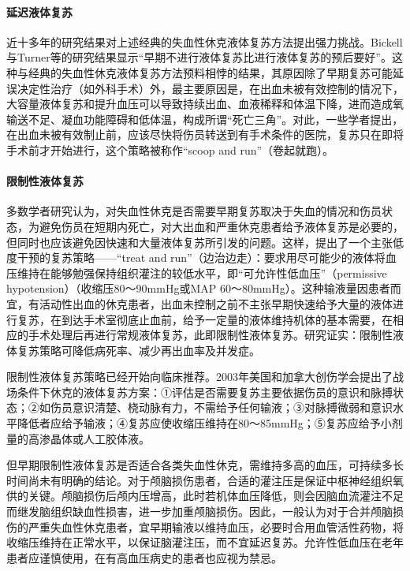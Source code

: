 \paragraph{延迟液体复苏}

近十多年的研究结果对上述经典的失血性休克液体复苏方法提出强力挑战。Bickell与Turner等的研究结果显示“早期不进行液体复苏比进行液体复苏的预后要好”。这种与经典的失血性休克液体复苏方法预料相悖的结果，其原因除了早期复苏可能延误决定性治疗（如外科手术）外，最主要原因是，在出血未被有效控制的情况下，大容量液体复苏和提升血压可以导致持续出血、血液稀释和体温下降，进而造成氧输送不足、凝血功能障碍和低体温，构成所谓“死亡三角”。对此，一些学者提出，在出血未被有效制止前，应该尽快将伤员转送到有手术条件的医院，复苏只在即将手术前才开始进行，这个策略被称作“scoop
and run”（卷起就跑）。

\paragraph{限制性液体复苏}

多数学者研究认为，对失血性休克是否需要早期复苏取决于失血的情况和伤员状态，为避免伤员在短期内死亡，对大出血和严重休克患者给予液体复苏是必要的，但同时也应该避免因快速和大量液体复苏所引发的问题。这样，提出了一个主张低度干预的复苏策略------“treat
and
run”（边治边走）：要求用尽可能少的液体将血压维持在能够勉强保持组织灌注的较低水平，即“可允许性低血压”（permissive
hypotension）（收缩压80～90mmHg或MAP
60～80mmHg）。这种输液量因患者而宜，有活动性出血的休克患者，出血未控制之前不主张早期快速给予大量的液体进行复苏，在到达手术室彻底止血前，给予一定量的液体维持机体的基本需要，在相应的手术处理后再进行常规液体复苏，此即限制性液体复苏。研究证实：限制性液体复苏策略可降低病死率、减少再出血率及并发症。

限制性液体复苏策略已经开始向临床推荐。2003年美国和加拿大创伤学会提出了战场条件下休克的液体复苏方案：①评估是否需要复苏主要依据伤员的意识和脉搏状态；②如伤员意识清楚、桡动脉有力，不需给予任何输液；③对脉搏微弱和意识水平降低者应给予输液；④复苏应使收缩压维持在80～85mmHg；⑤复苏应给予小剂量的高渗晶体或人工胶体液。

但早期限制性液体复苏是否适合各类失血性休克，需维持多高的血压，可持续多长时间尚未有明确的结论。对于颅脑损伤患者，合适的灌注压是保证中枢神经组织氧供的关键。颅脑损伤后颅内压增高，此时若机体血压降低，则会因脑血流灌注不足而继发脑组织缺血性损害，进一步加重颅脑损伤。因此，一般认为对于合并颅脑损伤的严重失血性休克患者，宜早期输液以维持血压，必要时合用血管活性药物，将收缩压维持在正常水平，以保证脑灌注压，而不宜延迟复苏。允许性低血压在老年患者应谨慎使用，在有高血压病史的患者也应视为禁忌。

